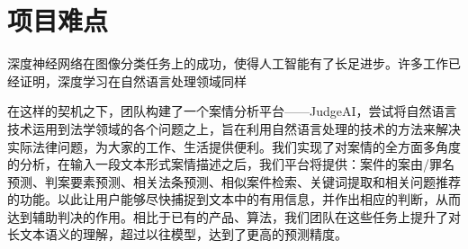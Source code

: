 \section{项目难点}
深度神经网络在图像分类任务上的成功，使得人工智能有了长足进步。许多工作已经证明，深度学习在自然语言处理领域同样


在这样的契机之下，团队构建了一个案情分析平台——JudgeAI，尝试将自然语言技术运用到法学领域的各个问题之上，旨在利用自然语言处理的技术的方法来解决实际法律问题，为大家的工作、生活提供便利。我们实现了对案情的全方面多角度的分析，在输入一段文本形式案情描述之后，我们平台将提供：案件的案由/罪名预测、判案要素预测、相关法条预测、相似案件检索、关键词提取和相关问题推荐的功能。以此让用户能够尽快捕捉到文本中的有用信息，并作出相应的判断，从而达到辅助判决的作用。相比于已有的产品、算法，我们团队在这些任务上提升了对长文本语义的理解，超过以往模型，达到了更高的预测精度。




